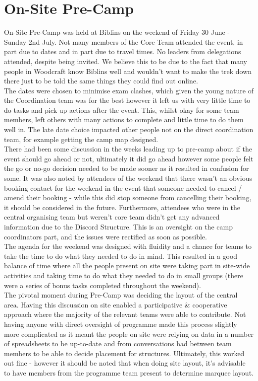 \chapter{On-Site Pre-Camp}
On-Site Pre-Camp was held at Biblins on the weekend of Friday 30 June - Sunday 2nd July. Not many members of the Core Team attended the event, in part due to dates and in part due to travel times. No leaders from delegations attended, despite being invited. We believe this to be due to the fact that many people in Woodcraft know Biblins well and wouldn't want to make the trek down there just to be told the same things they could find out online.\\

The dates were chosen to minimise exam clashes, which given the young nature of the Coordination team was for the best however it left us with very little time to do tasks and pick up actions after the event. This, whilst okay for some team members, left others with many actions to complete and little time to do them well in. The late date choice impacted other people not on the direct coordination team, for example getting the camp map designed.\\

There had been some discussion in the weeks leading up to pre-camp about if the event should go ahead or not, ultimately it did go ahead however some people felt the go or no-go decision needed to be made sooner as it resulted in confusion for some. It was also noted by attendees of the weekend that there wasn't an obvious booking contact for the weekend in the event that someone needed to cancel / amend their booking - while this did stop someone from cancelling their booking, it should be considered in the future. Furthermore, attendees who were in the central organising team but weren't core team didn't get any advanced information due to the Discord Structure. This is an oversight on the camp coordinators part, and the issues were rectified as soon as possible. \\

The agenda for the weekend was designed with fluidity and a chance for teams to take the time to do what they needed to do in mind. This resulted in a good balance of time where all the people present on site were taking part in site-wide activities and taking time to do what they needed to do in small groups (there were a series of bonus tasks completed throughout the weekend).\\

The pivotal moment during Pre-Camp was deciding the layout of the central area. Having this discussion on site enabled a participative \& cooperative approach where the majority of the relevant teams were able to contribute. Not having anyone with direct oversight of programme made this process slightly more complicated as it meant the people on site were relying on data in a number of spreadsheets to be up-to-date and from conversations had between team members to be able to decide placement for structures. Ultimately, this worked out fine - however it should be noted that when doing site layout, it's advisable to have members from the programme team present to determine marquee layout. \\

